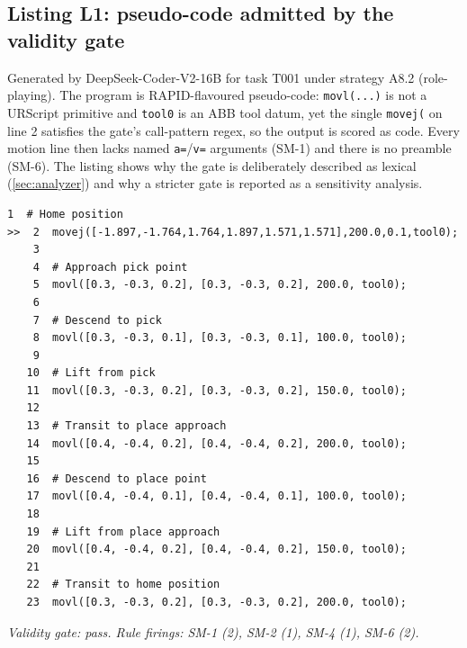 \subsection{Listing L1: pseudo-code admitted by the validity gate}
Generated by DeepSeek-Coder-V2-16B for task T001 under strategy A8.2 (role-playing).
The program is RAPID-flavoured pseudo-code: \texttt{movl(...)} is not a URScript
primitive and \texttt{tool0} is an ABB tool datum, yet the single \texttt{movej(} on
line 2 satisfies the gate's call-pattern regex, so the output is scored as code. Every
motion line then lacks named \texttt{a=}/\texttt{v=} arguments (SM-1) and there is no
preamble (SM-6). The listing shows why the gate is deliberately described as lexical
(\ref{sec:analyzer}) and why a stricter gate is reported as a sensitivity analysis.
\begin{lstlisting}[breaklines=true,breakindent=28pt,basicstyle=\scriptsize\ttfamily,columns=fullflexible,keepspaces=true,frame=single,framerule=0.3pt,xleftmargin=2pt,xrightmargin=2pt]
    1  # Home position
>>  2  movej([-1.897,-1.764,1.764,1.897,1.571,1.571],200.0,0.1,tool0);
    3  
    4  # Approach pick point
    5  movl([0.3, -0.3, 0.2], [0.3, -0.3, 0.2], 200.0, tool0);
    6  
    7  # Descend to pick
    8  movl([0.3, -0.3, 0.1], [0.3, -0.3, 0.1], 100.0, tool0);
    9  
   10  # Lift from pick
   11  movl([0.3, -0.3, 0.2], [0.3, -0.3, 0.2], 150.0, tool0);
   12  
   13  # Transit to place approach
   14  movl([0.4, -0.4, 0.2], [0.4, -0.4, 0.2], 200.0, tool0);
   15  
   16  # Descend to place point
   17  movl([0.4, -0.4, 0.1], [0.4, -0.4, 0.1], 100.0, tool0);
   18  
   19  # Lift from place approach
   20  movl([0.4, -0.4, 0.2], [0.4, -0.4, 0.2], 150.0, tool0);
   21  
   22  # Transit to home position
   23  movl([0.3, -0.3, 0.2], [0.3, -0.3, 0.2], 200.0, tool0);
\end{lstlisting}

\noindent\emph{Validity gate: pass. Rule firings: SM-1 (2), SM-2 (1), SM-4 (1), SM-6 (2).}

